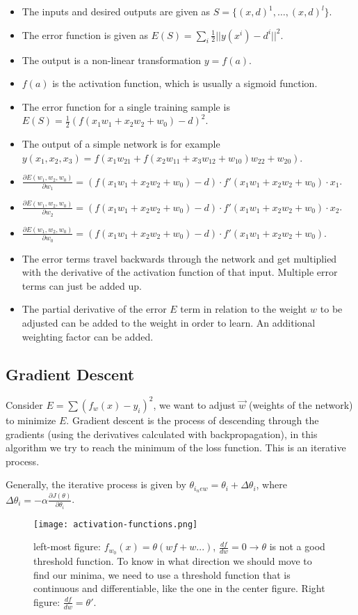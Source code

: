 \documentclass[main]{subfiles}
\begin{document}
\begin{itemize}[noitemsep,nolistsep]
	\item The inputs and desired outputs are given as $S=\{(x,d)^1,\ldots,(x,d)^l\}$.
	\item The error function is given as $E(S) = \sum_i\frac{1}{2}||y(x^i)-d^i||^2$.
	\item The output is a non-linear transformation $y=f(a)$.
	\item $f(a)$ is the activation function, which is usually a sigmoid function.
	\item The error function for a single training sample is $E(S)=\frac{1}{2}(f(x_1w_1+x_2w_2+w_0)-d)^2$.
	\item The output of a simple network is for example $y(x_1,x_2,x_3)=f(x_1w_{21}+f(x_2w_{11}+x_3w_{12}+w_{10})w_{22}+w_{20})$.
	\item $\frac{\partial E(w_1,w_2,w_0)}{\partial w_1}=(f(x_1w_1+x_2w_2+w_0)-d)\cdot f'(x_1w_1+x_2w_2+w_0)\cdot x_1$.
	\item $\frac{\partial E(w_1,w_2,w_0)}{\partial w_2}=(f(x_1w_1+x_2w_2+w_0)-d)\cdot f'(x_1w_1+x_2w_2+w_0)\cdot x_2$.
	\item $\frac{\partial E(w_1,w_2,w_0)}{\partial w_0}=(f(x_1w_1+x_2w_2+w_0)-d)\cdot f'(x_1w_1+x_2w_2+w_0)$.
	\item The error terms travel backwards through the network and get multiplied with the derivative of the activation function of that input. Multiple error terms can just be added up.
	\item The partial derivative of the error $E$ term in relation to the weight $w$ to be adjusted can be added to the weight in order to learn. An additional weighting factor can be added.
\end{itemize}

\subsection{Gradient Descent}
Consider $E = \sum(f_w(x) - y_i)^2$, we want to adjust $\vec{w}$ (weights of the network) to minimize $E$.
Gradient descent is the process of descending through the gradients (using the derivatives calculated with backpropagation), in this algorithm we try to reach the minimum of the loss function.
This is an iterative process.

Generally, the iterative process is given by $\theta_{i_new} = \theta_i + \Delta \theta_i$, where $\Delta \theta_i = - \alpha \frac{\partial J(\theta)}{\partial \theta_i}$.

\begin{figure}[H]
	\centering
	\texttt{[image: activation-functions.png]}
	\caption{left-most figure: $f_{w_0} (x) = \theta(wf + w...)$, $\frac{df}{dw} = 0 \rightarrow \theta$ is not a good threshold function.
To know in what direction we should move to find our minima, we need to use a threshold function that is continuous and differentiable, like the one in the center figure.
Right figure: $\frac{df}{dw} = \theta\prime$.}
\end{figure}
\end{document}
